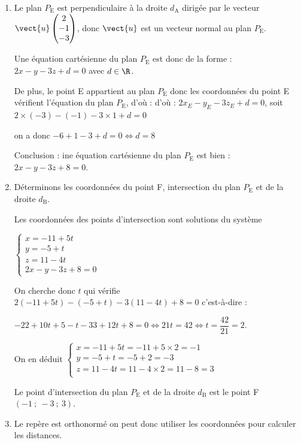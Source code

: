 \begin{enumerate}
\begin{enumerate}
Le point E$(-3~;~-1~;~1)$  correspond au point de paramètre $s = 2$ donc l'avion Alpha passe par le point~E.
		\item Le plan  $P_{\mathrm{E}}$ est perpendiculaire à la droite  $d_{\mathrm{A}}$ dirigée par le vecteur $\vect{u}\begin{pmatrix}2\\- 1\\- 3\end{pmatrix}$, donc $\vect{u}$ est un vecteur normal au plan $P_{\mathrm{E}}$.

Une équation cartésienne du plan $P_{\mathrm{E}}$ est donc de la forme : $2x - y - 3z + d = 0$ avec $d\in \R$.

De plus, le point E appartient au plan  $P_{\mathrm{E}}$ donc les coordonnées du point E vérifient l'équation du plan $P_{\mathrm{E}}$,
		d'où : d'où : $2x_E - y_E - 3z_E + d = 0$, soit $2 \times (-3) - (-1) - 3 \times 1 + d = 0$

on a donc $-6+1-3+d=0 \iff d = 8$

Conclusion : ine équation cartésienne du plan  $P_{\mathrm{E}}$ est bien : $2x - y - 3z + 8 = 0.$
		\item Déterminons les coordonnées du point F,  intersection du plan $P_{\mathrm{E}}$ et de la droite $d_{\mathrm{B}}$.

Les coordonnées des points d'intersection sont solutions du système

$\begin{cases}
x=-11+5t\\ y=-5+t \\ z=11-4t \\ 2x-y-3z+8 = 0
\end{cases}$

On cherche donc $t$ qui vérifie $2(-11 + 5t)- (-5 + t)-3(11 - 4t) + 8 = 0$ c'est-à-dire : 

$-22+10t +5-t -33 +12t+8=0 \iff 21t= 42 \iff t=\dfrac{42}{21} = 2$.

\smallskip

On en déduit
$\begin{cases}
x=-11+5t=-11+5\times 2 =-1\\
y= -5+t=-5+2=-3\\
z=11-4t=11-4\times 2 =11-8=3\\
\end{cases}$

Le point d'intersection du plan  $P_{\mathrm{E}}$ et de la droite $d_{\mathrm{B}}$ est le point  F$(-1~;~-3~;~3)$.
		\item Le repère est orthonormé on peut donc utiliser les coordonnées pour calculer les distances.


\end{enumerate}
\end{enumerate}
